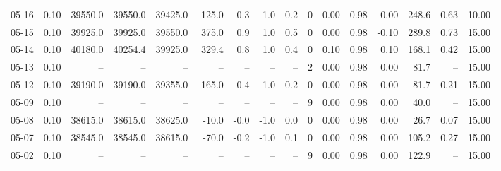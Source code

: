 \begin{threeparttable}
{\begin{tabular}{lrrrrrrrrrrrrrrr}
  05-16 &     0.10 & 39550.0 & 39550.0 & 39425.0 &      125.0 &            0.3 &                      1.0 &                 0.2 &              0 &       0.00 &      0.98 &           0.00 &            248.6 &            0.63 &                  10.00 \\
  05-15 &     0.10 & 39925.0 & 39925.0 & 39550.0 &      375.0 &            0.9 &                      1.0 &                 0.5 &              0 &       0.00 &      0.98 &          -0.10 &            289.8 &            0.73 &                  15.00 \\
  05-14 &     0.10 & 40180.0 & 40254.4 & 39925.0 &      329.4 &            0.8 &                      1.0 &                 0.4 &              0 &       0.10 &      0.98 &           0.10 &            168.1 &            0.42 &                  15.00 \\
  05-13 &     0.10 &      -- &      -- &      -- &         -- &             -- &                       -- &                  -- &              2 &       0.00 &      0.98 &           0.00 &             81.7 &              -- &                  15.00 \\
  05-12 &     0.10 & 39190.0 & 39190.0 & 39355.0 &     -165.0 &           -0.4 &                     -1.0 &                 0.2 &              0 &       0.00 &      0.98 &           0.00 &             81.7 &            0.21 &                  15.00 \\
  05-09 &     0.10 &      -- &      -- &      -- &         -- &             -- &                       -- &                  -- &              9 &       0.00 &      0.98 &           0.00 &             40.0 &              -- &                  15.00 \\
  05-08 &     0.10 & 38615.0 & 38615.0 & 38625.0 &      -10.0 &           -0.0 &                     -1.0 &                 0.0 &              0 &       0.00 &      0.98 &           0.00 &             26.7 &            0.07 &                  15.00 \\
  05-07 &     0.10 & 38545.0 & 38545.0 & 38615.0 &      -70.0 &           -0.2 &                     -1.0 &                 0.1 &              0 &       0.00 &      0.98 &           0.00 &            105.2 &            0.27 &                  15.00 \\
  05-02 &     0.10 &      -- &      -- &      -- &         -- &             -- &                       -- &                  -- &              9 &       0.00 &      0.98 &           0.00 &            122.9 &              -- &                  15.00 \\

\end{tabular}}
\end{threeparttable}
